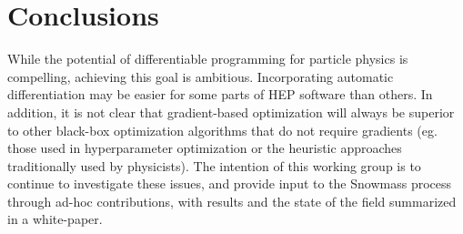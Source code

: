 \documentclass{article}
\begin{document}


\section{Conclusions}

While the potential of differentiable programming for particle physics is compelling, achieving this goal is ambitious. Incorporating automatic differentiation may be easier for some parts of HEP software than others. In addition, it is not clear that gradient-based optimization will always be superior to other black-box optimization algorithms that do not require gradients (eg. those used in hyperparameter optimization or the heuristic approaches traditionally used by physicists). The intention of this working group is to continue to investigate these issues, and provide input to the Snowmass process through ad-hoc contributions, with results and the state of the field summarized in a white-paper. 





\end{document}
